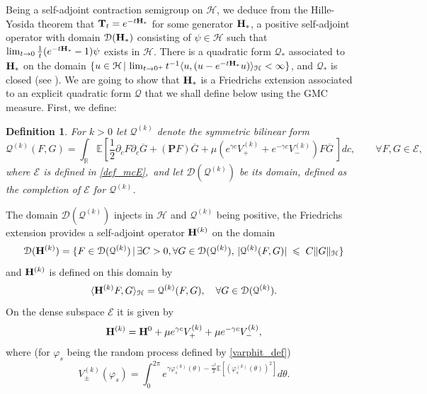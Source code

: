 \documentclass[11pt]{amsart}
\numberwithin{equation}{section}
\newtheorem{definition}[theorem]{Definition}
\theoremstyle{definition}
\renewcommand{\leq}{\;\leqslant\;}                   %
\newcommand{\R}{\mathbb{R}}
\newcommand{\cjd}{\rangle}
\newcommand{\cjg}{\langle}
\def\bP{\mathbf{P}}
\def\E{\mathbb{E}}
\newcommand{\bbar}{\overline}
\newcommand{\mc}{\mathcal}
\newcommand{\caD}{{\mathcal D}}
\begin{document}
Being a self-adjoint contraction semigroup on $\mc{H}$, we deduce from the Hille-Yosida theorem that ${\bf T}_t=e^{-t{\bf H}_*}$ for some 
 generator ${\bf H}_*$, a positive self-adjoint operator with domain $\caD({\bf H}_*)$ consisting of $\psi\in \mc{H}$ 
 such that $\lim_{t\to 0}\frac{1}{t}(e^{-t{\bf H}_*}-1)\psi$ exists in $\mc{H}$. There is a quadratic form $\mc{Q}_*$ associated to ${\bf H}_*$ on the domain $\{ u\in \mc{H}\,|\, \lim_{t\to 0^+}t^{-1}\cjg u, (u-e^{-t{\bf H}_*}u)\cjd_{\mc{H}}<\infty \}$, and $\mc{Q}_*$ is closed (see  \cite[Chapter 1, Lemma 4.2]{S98}).
We are going to show that ${\bf H}_*$ is a Friedrichs extension associated to an explicit quadratic form $\mc{Q}$ that we shall define below using the GMC measure. First, we define:
\begin{definition}
For $k > 0$ let $\mc{Q}^{(k)}$ denote the symmetric bilinear form
\begin{equation}
\mc{Q}^{(k)}(F,G)
=
\int_\R \E \left[ \frac 12\partial_c F\partial_c \bbar{G} + (\bP F)\bbar{G}+ \mu  (e^{\gamma c}V_+^{(k)}+e^{-\gamma c}V_-^{(k)}) F \bbar{G} \,\right] dc , 
\qquad \forall F,G \in \mathcal{E},
\end{equation}
where $\mc{E}$ is defined in \eqref{def_mcE}, and let $\mc{D}(\mc{Q}^{(k)})$ be its domain, defined as the completion of $\mc{E}$ for $\mc{Q}^{(k)}$.
\end{definition}
The domain $\mc{D}(\mc{Q}^{(k)})$ injects in $\mc{H}$ and $\mc{Q}^{(k)}$ being positive, the Friedrichs extension provides a self-adjoint operator ${\bf H}^{(k)}$ on the domain 
\[ \mc{D}({\bf H}^{(k)})=\{ F\in \mc{D}(\mc{Q}^{(k)})\,|\, \exists C>0, \forall G \in \mc{D}(\mc{Q}^{(k)}),\,  
|\mc{Q}^{(k)}(F,G)|\leq C\|G\|_{\mc{H}}\}\]
and ${\bf H}^{(k)}$ is defined on this domain by 
\[ \cjg {\bf H}^{(k)}F,G\cjd_{\mc{H}}=\mc{Q}^{(k)}(F,G), \quad \forall G \in \mc{D}(\mc{Q}^{(k)}).\]
On the dense subspace $\mc{E}$ it is given by 
\[  {\bf H}^{(k)}={\bf H}^0+\mu e^{\gamma c}V_+^{(k)}+\mu e^{-\gamma c}V_-^{(k)},\]
where (for $\varphi_s$ being the random process defined by \eqref{varphit_def})
\[ V_\pm^{(k)}(\varphi_s)=\int_0^{2\pi}e^{\gamma \varphi_s^{(k)}(\theta)-\frac{\gamma^2}{2}\E[(\varphi_s^{(k)}(\theta))^2]}d\theta.\]
\end{document}
